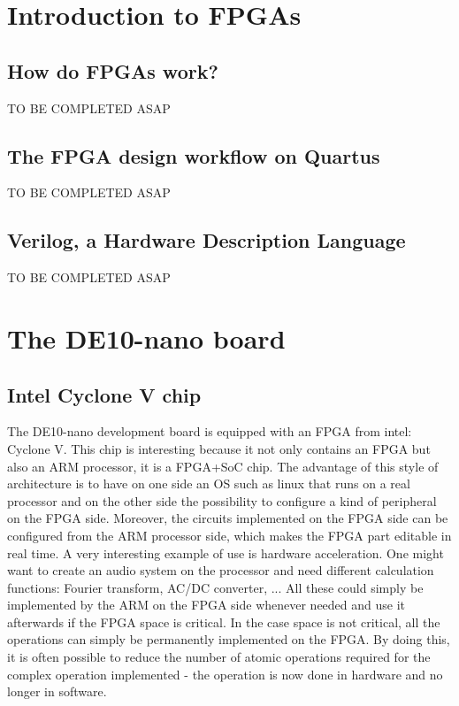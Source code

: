 \documentclass[12pt]{article}
\begin{document}
\section{Introduction to FPGAs}

\subsection{How do FPGAs work?}
TO BE COMPLETED ASAP

\subsection{The FPGA design workflow on Quartus}
TO BE COMPLETED ASAP

\subsection{Verilog, a Hardware Description Language}
TO BE COMPLETED ASAP

\section{The DE10-nano board}

\subsection{Intel Cyclone V chip}
The DE10-nano development board is equipped with an FPGA from intel: Cyclone V. This chip is interesting because it not only contains an FPGA but also an ARM processor, it is a FPGA+SoC chip. The advantage of this style of architecture is to have on one side an OS such as linux that runs on a real processor and on the other side the possibility to configure a kind of peripheral on the FPGA side. Moreover, the circuits implemented on the FPGA side can be configured from the ARM processor side, which makes the FPGA part editable in real time. A very interesting example of use is hardware acceleration. One might want to create an audio system on the processor and need different calculation functions: Fourier transform, AC/DC converter, ... All these could simply be implemented by the ARM on the FPGA side whenever needed and use it afterwards if the FPGA space is critical. In the case space is not critical, all the operations can simply be permanently implemented on the FPGA. By doing this, it is often possible to reduce the number of atomic operations required for the complex operation implemented - the operation is now done in hardware and no longer in software.
\end{document}
